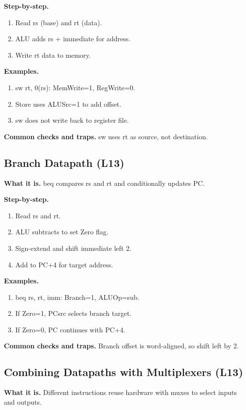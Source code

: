 \documentclass[11pt]{article}
\begin{document}
\textbf{Step-by-step.}
\begin{enumerate}[leftmargin=*]
  \item Read rs (base) and rt (data).
  \item ALU adds rs + immediate for address.
  \item Write rt data to memory.
\end{enumerate}

\textbf{Examples.}
\begin{enumerate}[leftmargin=*]
  \item sw rt, 0(rs): MemWrite=1, RegWrite=0.
  \item Store uses ALUSrc=1 to add offset.
  \item sw does not write back to register file.
\end{enumerate}

\textbf{Common checks and traps.} sw uses rt as source, not destination.

\subsection{Branch Datapath (L13)}
\textbf{What it is.} beq compares rs and rt and conditionally updates PC.

\textbf{Step-by-step.}
\begin{enumerate}[leftmargin=*]
  \item Read rs and rt.
  \item ALU subtracts to set Zero flag.
  \item Sign-extend and shift immediate left 2.
  \item Add to PC+4 for target address.
\end{enumerate}

\textbf{Examples.}
\begin{enumerate}[leftmargin=*]
  \item beq rs, rt, imm: Branch=1, ALUOp=sub.
  \item If Zero=1, PCsrc selects branch target.
  \item If Zero=0, PC continues with PC+4.
\end{enumerate}

\textbf{Common checks and traps.} Branch offset is word-aligned, so shift left by 2.

\subsection{Combining Datapaths with Multiplexers (L13)}
\textbf{What it is.} Different instructions reuse hardware with muxes to select inputs and outputs.
\end{document}
